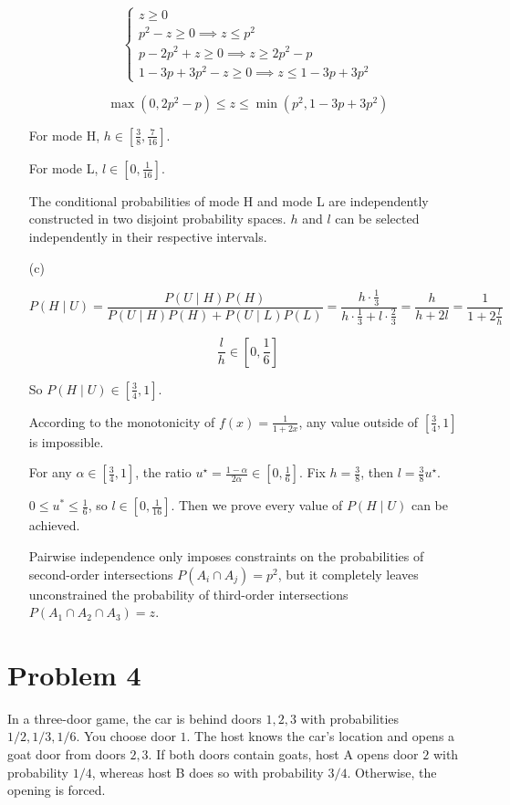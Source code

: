\documentclass[11pt,a4paper]{article}
\newcommand{\Prob}{P}
\begin{document}
\begin{enumerate}
    $$
    \begin{cases}
        z \ge 0 \\
        p^2 - z \ge 0 \implies z \le p^2 \\
        p - 2p^2 + z \ge 0 \implies z \ge 2p^2 - p \\
        1 - 3p + 3p^2 - z \ge 0 \implies z \le 1 - 3p + 3p^2
    \end{cases}
    $$

    $$
    \max(0, 2p^2 - p) \le z \le \min(p^2, 1 - 3p + 3p^2)
    $$

    For mode H, $h \in \left[\frac{3}{8}, \frac{7}{16}\right]$.
    
    For mode L, $l \in \left[0, \frac{1}{16}\right]$.

    The conditional probabilities of mode H and mode L are independently constructed in two disjoint probability spaces. $h$ and $l$ can be selected independently in their respective intervals.

    \item[(c)]

    $$
    P(H \mid U)
    = \frac{P(U \mid H) P(H)}{P(U \mid H) P(H) + P(U \mid L) P(L)}
    = \frac{h \cdot \frac{1}{3}}{h \cdot \frac{1}{3} + l \cdot \frac{2}{3}}
    = \frac{h}{h + 2l}
    = \frac{1}{1 + 2\frac{l}{h}}
    $$

    $$
    \frac{l}{h} \in \left[0, \frac{1}{6}\right]
    $$

    So $\Prob(H \mid U) \in \left[\frac{3}{4}, 1\right]$.

    According to the monotonicity of $f(x) = \frac{1}{1 + 2x}$, any value outside of $\left[\frac{3}{4}, 1\right]$ is impossible.

    For any $\alpha \in \left[\frac{3}{4}, 1\right]$, the ratio $u^\star = \frac{1-\alpha}{2\alpha} \in [0, \frac{1}{6}]$. Fix $h = \frac{3}{8}$, then $l = \frac{3}{8} u^\star$.

    $0 \le u^* \le \frac{1}{6}$, so $l \in [0, \frac{1}{16}]$. Then we prove every value of $P(H \mid U)$ can be achieved.

    Pairwise independence only imposes constraints on the probabilities of second-order intersections $P(A_i \cap A_j) = p^2$, but it completely leaves unconstrained the probability of third-order intersections $P(A_1 \cap A_2 \cap A_3) = z$.
\end{enumerate}

\clearpage
\section*{Problem 4}
In a three-door game, the car is behind doors $1,2,3$ with probabilities
$1/2,1/3,1/6$. You choose door $1$. The host knows the car's location and
opens a goat door from doors $2,3$. If both doors contain goats, host A
opens door $2$ with probability $1/4$, whereas host B does so with
probability $3/4$. Otherwise, the opening is forced.
\end{document}

